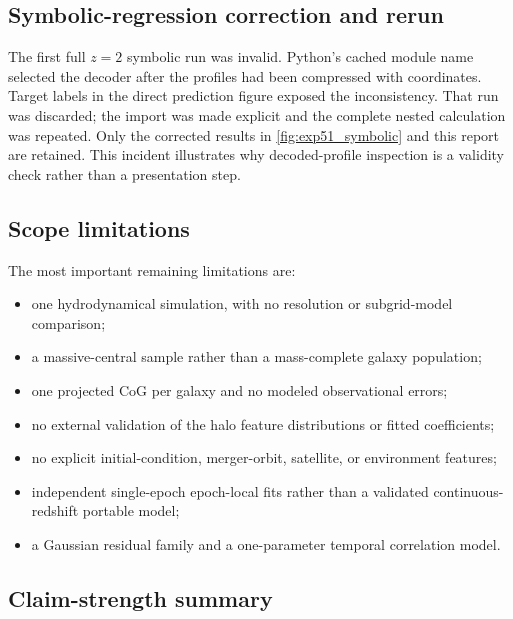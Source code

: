 \subsection{Symbolic-regression correction and rerun}

The first full $z=2$ symbolic run was invalid. Python's cached module name
selected the \ExpFifty{} decoder after the profiles had been compressed with
\ExpFiftyOne{} coordinates. Target labels in the direct prediction figure
exposed the inconsistency. That run was discarded; the import was made explicit
and the complete nested calculation was repeated. Only the corrected results in
\cref{fig:exp51_symbolic} and this report are retained. This incident illustrates
why decoded-profile inspection is a validity check rather than a presentation
step.

\subsection{Scope limitations}

The most important remaining limitations are:
\begin{itemize}
  \item one hydrodynamical simulation, with no resolution or subgrid-model
  comparison;
  \item a massive-central sample rather than a mass-complete galaxy population;
  \item one projected CoG per galaxy and no modeled observational errors;
  \item no external validation of the halo feature distributions or fitted
  coefficients;
  \item no explicit initial-condition, merger-orbit, satellite, or environment
  features;
  \item independent single-epoch epoch-local fits rather than a validated
  continuous-redshift portable model;
  \item a Gaussian residual family and a one-parameter temporal correlation
  model.
\end{itemize}

\subsection{Claim-strength summary}

